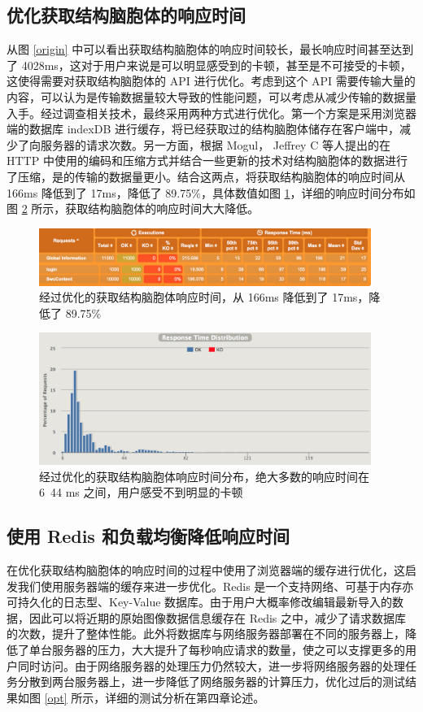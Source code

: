 \subsection{优化获取结构脑胞体的响应时间}
从图 \ref{origin} 中可以看出获取结构脑胞体的响应时间较长，最长响应时间甚至达到了 4028ms，这对于用户来说是可以明显感受到的卡顿，甚至是不可接受的卡顿，这使得需要对获取结构脑胞体的 API 进行优化。考虑到这个 API 需要传输大量的内容，可以认为是传输数据量较大导致的性能问题，可以考虑从减少传输的数据量入手。经过调查相关技术，最终采用两种方式进行优化。第一个方案是采用浏览器端的数据库 indexDB 进行缓存，将已经获取过的结构脑胞体储存在客户端中，减少了向服务器的请求次数。另一方面，根据 Mogul， Jeffrey C 等人提出的在 HTTP 中使用的编码和压缩方式并结合一些更新的技术对结构脑胞体的数据进行了压缩，是的传输的数据量更小。结合这两点，将获取结构脑胞体的响应时间从 166ms 降低到了 17ms，降低了 89.75\%，具体数值如图 \ref{swccontent}，详细的响应时间分布如图 \ref{swcdic} 所示，获取结构脑胞体的响应时间大大降低。

\begin{figure}
\centering
\includegraphics[width=108mm]{images/swccontent}
\caption{经过优化的获取结构脑胞体响应时间，从 166ms 降低到了 17ms，降低了 89.75\%}
\label{swccontent}
\end{figure}

\begin{figure}
\centering
\includegraphics[width=108mm]{images/swcdic}
\caption{经过优化的获取结构脑胞体响应时间分布，绝大多数的响应时间在 6~44 ms 之间，用户感受不到明显的卡顿}
\label{swcdic}
\end{figure}

\subsection{使用 Redis 和负载均衡降低响应时间}
在优化获取结构脑胞体的响应时间的过程中使用了浏览器端的缓存进行优化，这启发我们使用服务器端的缓存来进一步优化。Redis 是一个支持网络、可基于内存亦可持久化的日志型、Key-Value 数据库。由于用户大概率修改编辑最新导入的数据，因此可以将近期的原始图像数据信息缓存在 Redis 之中，减少了请求数据库的次数，提升了整体性能。此外将数据库与网络服务器部署在不同的服务器上，降低了单台服务器的压力，大大提升了每秒响应请求的数量，使之可以支撑更多的用户同时访问。由于网络服务器的处理压力仍然较大，进一步将网络服务器的处理任务分散到两台服务器上，进一步降低了网络服务器的计算压力，优化过后的测试结果如图 \ref{opt} 所示，详细的测试分析在第四章论述。

